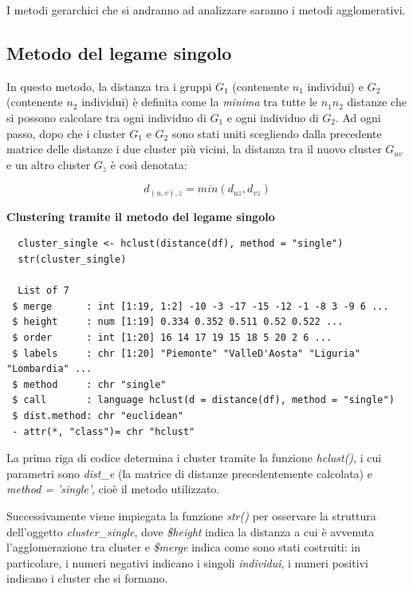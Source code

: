 I metodi gerarchici che si andranno ad analizzare saranno i metodi agglomerativi.

\subsection{Metodo del legame singolo}\label{cap5.2.1}

In questo metodo, la distanza tra i gruppi $G_1$ (contenente $n_1$ individui) e $G_2$ (contenente $n_2$ individui) è definita come la \textit{minima} tra tutte le $n_1 n_2$ distanze che si possono calcolare tra ogni individuo di $G_1$ e ogni individuo di $G_2$. Ad ogni passo, dopo che i cluster $G_1$ e $G_2$ sono stati uniti scegliendo dalla precedente matrice delle distanze i due cluster più vicini, la distanza tra il nuovo cluster $G_{uv}$ e un altro cluster $G_z$ è così denotata:

\[d_{(u,v), z} = min(d_{uz}, d_{vz})\]

\noindent \textbf{Clustering tramite il metodo del legame singolo}

\vspace{5mm}
\begin{lstlisting}
  cluster_single <- hclust(distance(df), method = "single")
  str(cluster_single)

  List of 7
 $ merge      : int [1:19, 1:2] -10 -3 -17 -15 -12 -1 -8 3 -9 6 ...
 $ height     : num [1:19] 0.334 0.352 0.511 0.52 0.522 ...
 $ order      : int [1:20] 16 14 17 19 15 18 5 20 2 6 ...
 $ labels     : chr [1:20] "Piemonte" "ValleD'Aosta" "Liguria" "Lombardia" ...
 $ method     : chr "single"
 $ call       : language hclust(d = distance(df), method = "single")
 $ dist.method: chr "euclidean"
 - attr(*, "class")= chr "hclust"
\end{lstlisting}
\vspace{5mm}

La prima riga di codice determina i cluster tramite la funzione \textit{hclust()}, i cui parametri sono \textit{dist\_e} (la matrice di distanze precedentemente calcolata) e \textit{method = 'single'}, cioè il metodo utilizzato.

Successivamente viene impiegata la funzione \textit{str()} per osservare la struttura dell'oggetto \textit{cluster\_single}, dove \textit{\$height} indica la distanza a cui è avvenuta l'agglomerazione tra cluster e \textit{\$merge} indica come sono stati costruiti: in particolare, i numeri negativi indicano i singoli \textit{individui}, i numeri positivi indicano i cluster che si formano.

